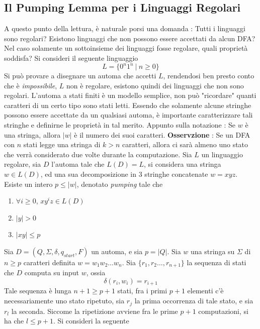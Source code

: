 \documentclass[10pt, letterpaper]{report}
\begin{document}
\subsection{Il Pumping Lemma per i Linguaggi Regolari}
A questo punto della lettura, è naturale porsi una domanda : Tutti i linguaggi sono regolari? Esistono linguaggi che 
non possono essere accettati da alcun DFA? Nel caso solamente un sottoinsieme dei linguaggi fosse regolare, quali proprietà 
soddisfa? Si consideri il seguente linguaggio 
$$ L=\{0^n1^n \ | \ n\ge 0\}$$
Si può provare a disegnare un automa che accetti $L$, rendendosi ben presto conto che è \textit{impossibile}, $L$ non è 
regolare, esistono quindi dei linguaggi che non sono regolari. L'automa a stati finiti è un modello semplice, non può 
"ricordare" quanti caratteri di un certo tipo sono stati letti. \acc 
Essendo che solamente alcune stringhe possono essere accettate da un qualsiasi automa, è importante caratterizzare tali 
stringhe e definirne le proprietà in tal merito. \acc 
Appunto sulla notazione : Se $w$ è una stringa, allora $|w|$ è il numero dei suoi caratteri.\acc
\textbf{Osservzione} : Se un DFA con $n$ stati legge una stringa di $k>n$ caratteri, allora ci sarà almeno uno stato 
che verrà considerato due volte durante la computazione. \acc 
{} Sia $L$ un linguaggio regolare, sia $D$ l'automa tale che $L(D)=L$, si considera una stringa 
$w\in L(D)$, ed una sua decomposizione in 3 stringhe concatenate $w=xyz$. Esiste un intero $p\le|w|$, denotato \textit{pumping}
 tale che \begin{enumerate}
    \item $\forall i\ge0$, $xy^iz\in L(D)$
    \item $|y|>0$
    \item $|xy|\le p$
\end{enumerate}
\dimo{} Sia $D=(Q,\Sigma,\delta,q_{start},F)$ un automa, e sia $p=|Q|$. Sia $w$ una stringa su $\Sigma$ di $n\ge p$ caratteri definita
$w=w_1w_2\dots w_n$. Sia $\{r_1,r_2\dots,r_{n+1}\}$ la sequenza di stati che $D$ computa su input $w$, ossia 
$$ \delta(r_i,w_i)=r_{i+1}$$
Tale sequenza è lunga $n+1\ge p+1$ stati, fra i primi $p+1$ elementi c'è necessariamente uno stato ripetuto, sia 
 $r_j$ la prima occorrenza di tale stato, e sia $r_l$ la seconda.\acc 
 Siccome la ripetizione avviene fra le prime $p+1$ computazioni, si ha che $l\le p+1$. Si consideri la seguente 
\end{document}
